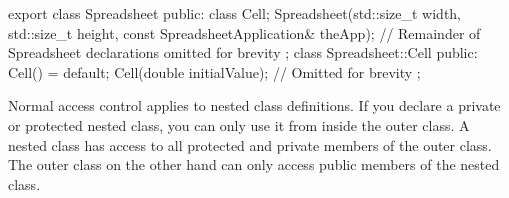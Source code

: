 \begin{cpp}
export class Spreadsheet
{
    public:
        class Cell;
        Spreadsheet(std::size_t width, std::size_t height,
            const SpreadsheetApplication& theApp);
        // Remainder of Spreadsheet declarations omitted for brevity
};
class Spreadsheet::Cell
{
    public:
        Cell() = default;
        Cell(double initialValue);
        // Omitted for brevity
};
\end{cpp}

Normal access control applies to nested class definitions. If you declare a private or protected nested class, you can only use it from inside the outer class. A nested class has access to all protected and private members of the outer class. The outer class on the other hand can only access public members of the nested class.











